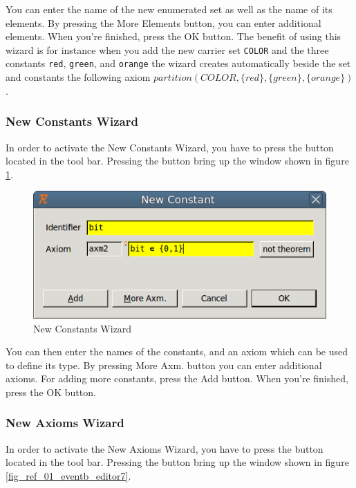 You can enter the name of the new enumerated set as well as the name of its elements. By pressing the \textsf{More Elements} button, you can enter additional elements. When you’re finished, press the \textsf{OK} button. The benefit of using this wizard is for instance when you add the new carrier set \texttt{COLOR} and the three constants \texttt{red}, \texttt{green}, and \texttt{orange} the wizard creates automatically beside the set and constants the following axiom $partition(COLOR , \{red\}, \{green\}, \{orange\})$.

\subsubsection{New Constants Wizard}

In order to activate the \textsf{New Constants Wizard}, you have to press the  button located in the tool bar. Pressing the button bring up the window shown in figure \ref{fig_ref_01_eventb_editor6}.

\begin{figure}[!h]
\begin{center}
	\includegraphics{img/reference/ref_01_eventb_editor6.png}
	\caption{New Constants Wizard}
	\label{fig_ref_01_eventb_editor6}
\end{center}
\end{figure}

You can then enter the names of the constants, and an axiom which can be used to define its type. By pressing \textsf{More Axm.} button you can enter additional axioms. For adding more constants, press the \textsf{Add} button. When you’re finished, press the \textsf{OK} button.

\subsubsection{New Axioms Wizard}

In order to activate the \textsf{New Axioms Wizard}, you have to press the  button located in the tool bar. Pressing the button bring up the window shown in figure \ref{fig_ref_01_eventb_editor7}.

